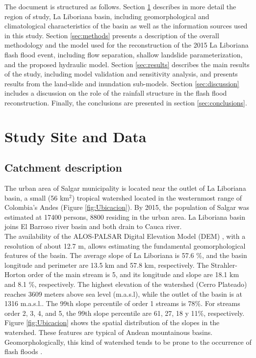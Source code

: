 \documentclass[hess, manuscript]{copernicus}
\begin{document}
The document is structured as follows. Section \ref{sec:data} describes in more detail the region of study, La Liboriana basin, including geomorphological and climatological characteristics of the basin as well as the information sources used in this study. Section \ref{sec:methods} presents a description of the overall methodology and the model used for the reconstruction of the 2015 La Liboriana flash flood event, including flow separation, shallow landslide parameterization, and the proposed hydraulic model. Section \ref{sec:results} describes the main results of the study, including model validation and sensitivity analysis, and presents results from the land-slide and inundation sub-models. Section \ref{sec:discussion} includes a discussion on the role of the rainfall structure in the flash flood reconstruction.  Finally,  the conclusions are presented in section \ref{sec:conclusions}.

\section{Study Site and Data}
\label{sec:data}

\subsection{Catchment description}

The urban area of Salgar municipality is located near the outlet of La Liboriana basin, a small (56 km$^2$) tropical watershed located in the westernmost range of Colombia's Andes (Figure \ref{fig:Ubicacion}).  By 2015, the population of Salgar was estimated at 17400 persons, 8800 residing in the urban area.  La Liboriana basin joins El Barroso river basin and both drain to Cauca river. \\

The availability of the ALOS-PALSAR Digital Elevation Model (DEM) \citep{ALOS}, with a resolution of about 12.7 m, allows estimating the fundamental geomorphological features of the basin. The average slope of La Liboriana is  57.6 \%, and the basin longitude and perimeter are 13.5 $\text{km}$ and 57.8 $\text{km}$, respectively.  The Strahler-Horton order of the main stream is 5, and its longitude and slope are 18.1 $\text{km}$ and 8.1 \%, respectively. The highest elevation of the watershed (Cerro Plateado) reaches 3609 meters above sea level (m.a.s.l), while the outlet of the basin is at 1316 m.a.s.l..  The 99th slope percentile of order 1 streams is 78\%. For streams order 2, 3, 4, and 5, the 99th slope percentile are 61, 27, 18 y 11\%, respectively. Figure \ref{fig:Ubicacion} shows the spatial distribution of the slopes in the watershed. These features are typical of Andean mountainous basins.  Geomorphologically, this kind of watershed tends to be prone to the occurrence of flash floods \citep{Lehmann2012, Penna2011, Martin2018,Longoni2016, Ozturk2018, Khosravi2018, Marchi2016, Bisht2018}.\\
\end{document}
